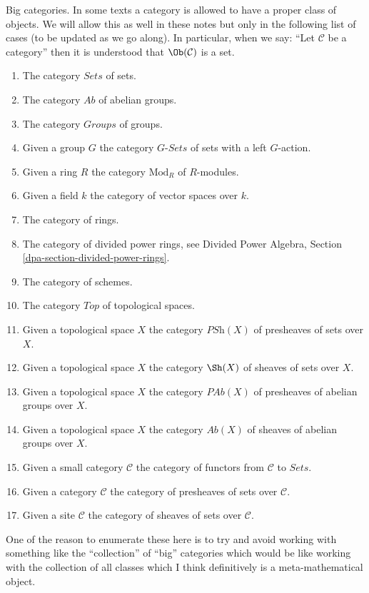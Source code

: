 \begin{remark}
Big categories. In some texts a category is allowed to have a proper
class of objects. We will allow this as well in these notes but only
in the following list of cases (to be updated as we go along).
In particular, when we say: ``Let $\mathcal{C}$ be a category''
then it is understood that $\Ob(\mathcal{C})$ is a set.
\begin{enumerate}
\item The category $\textit{Sets}$ of sets.
\item The category $\textit{Ab}$ of abelian groups.
\item The category $\textit{Groups}$ of groups.
\item Given a group $G$ the category $G\textit{-Sets}$ of
sets with a left $G$-action.
\item Given a ring $R$ the category $\text{Mod}_R$ of $R$-modules.
\item Given a field $k$ the category of vector spaces over $k$.
\item The category of rings.
\item The category of divided power rings, see
Divided Power Algebra, Section \ref{dpa-section-divided-power-rings}.
\item The category of schemes.
\item The category $\textit{Top}$ of topological spaces.
\item Given a topological space $X$ the category
$\textit{PSh}(X)$ of presheaves of sets over $X$.
\item Given a topological space $X$ the category
$\Sh(X)$ of sheaves of sets over $X$.
\item Given a topological space $X$ the category
$\textit{PAb}(X)$ of presheaves of abelian groups over $X$.
\item Given a topological space $X$ the category
$\textit{Ab}(X)$ of sheaves of abelian groups over $X$.
\item Given a small category $\mathcal{C}$ the category of functors
from $\mathcal{C}$ to $\textit{Sets}$.
\item Given a category $\mathcal{C}$ the category of presheaves of sets
over $\mathcal{C}$.
\item Given a site $\mathcal{C}$ the category of sheaves
of sets over $\mathcal{C}$.
\end{enumerate}
One of the reason to enumerate these here is to try and avoid
working with something like the ``collection'' of ``big'' categories
which would be like working with the collection of all classes
which I think definitively is a meta-mathematical object.
\end{remark}

